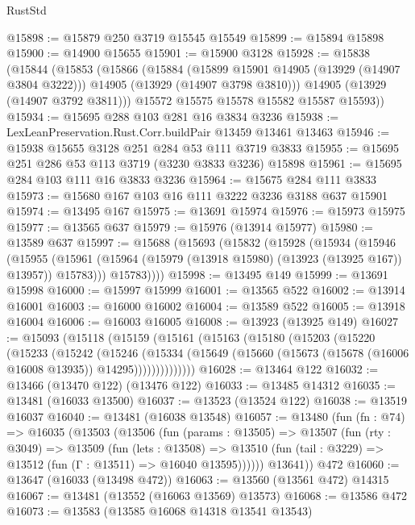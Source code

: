 \begin{lexlean}{RustStd}
\begin{coremodule}
@15898 := @15879 @250 @3719 @15545 @15549
@15899 := @15894 @15898
@15900 := @14900 @15655
@15901 := @15900 @3128
@15928 := @15838
    (@15844
      (@15853
        (@15866
          (@15884
            (@15899 @15901 @14905 (@13929 (@14907 @3804 @3222)))
            @14905
            (@13929 (@14907 @3798 @3810)))
          @14905
          (@13929 (@14907 @3792 @3811)))
        @15572
        @15575
        @15578
        @15582
        @15587
        @15593))
@15934 := @15695 @288 @103 @281 @16 @3834 @3236
@15938 := LexLeanPreservation.Rust.Corr.buildPair @13459 @13461 @13463
@15946 := @15938 @15655 @3128 @251 @284 @53 @111 @3719 @3833
@15955 := @15695 @251 @286 @53 @113 @3719 (@3230 @3833 @3236) @15898
@15961 := @15695 @284 @103 @111 @16 @3833 @3236
@15964 := @15675 @284 @111 @3833
@15973 := @15680 @167 @103 @16 @111 @3222 @3236 @3188 @637 @15901
@15974 := @13495 @167
@15975 := @13691 @15974
@15976 := @15973 @15975
@15977 := @13565 @637
@15979 := @15976 (@13914 @15977)
@15980 := @13589 @637
@15997 := @15688
    (@15693
      (@15832
        (@15928
          (@15934
            (@15946
              (@15955
                (@15961 (@15964 (@15979 (@13918 @15980) (@13923 (@13925 @167)) @13957)) @15783)))
            @15783))))
@15998 := @13495 @149
@15999 := @13691 @15998
@16000 := @15997 @15999
@16001 := @13565 @522
@16002 := @13914 @16001
@16003 := @16000 @16002
@16004 := @13589 @522
@16005 := @13918 @16004
@16006 := @16003 @16005
@16008 := @13923 (@13925 @149)
@16027 := @15093
    (@15118
      (@15159
        (@15161
          (@15163
            (@15180
              (@15203
                (@15220
                  (@15233
                    (@15242
                      (@15246
                        (@15334
                          (@15649
                            (@15660 (@15673 (@15678 (@16006 @16008 @13935)) @14295))))))))))))))
@16028 := @13464 @122
@16032 := @13466 (@13470 @122) (@13476 @122)
@16033 := @13485 @14312
@16035 := @13481 (@16033 @13500)
@16037 := @13523 (@13524 @122)
@16038 := @13519 @16037
@16040 := @13481 (@16038 @13548)
@16057 := @13480
    (fun (fn : @74) =>
    @16035
      (@13503
        (@13506
          (fun (params : @13505) =>
          @13507
            (fun (rty : @3049) =>
            @13509
              (fun (lets : @13508) =>
              @13510 (fun (tail : @3229) => @13512 (fun (Γ : @13511) => @16040 @13595))))))
        @13641))
    @472
@16060 := @13647 (@16033 (@13498 @472))
@16063 := @13560 (@13561 @472) @14315
@16067 := @13481 (@13552 (@16063 @13569) @13573)
@16068 := @13586 @472
@16073 := @13583 (@13585 @16068 @14318 @13541 @13543)

\end{coremodule}
\end{lexlean}

